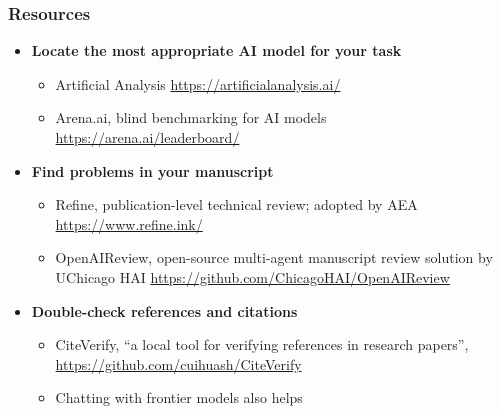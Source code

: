 \documentclass[aspectratio=169]{beamer}
\begin{document}
\begin{frame}
  \frametitle{Resources}
  \begin{itemize}
      \item \textbf{Locate the most appropriate AI model for your task}
        \begin{itemize}
          \item Artificial Analysis \url{https://artificialanalysis.ai/}
          \item Arena.ai, blind benchmarking for AI models \url{https://arena.ai/leaderboard/}
        \end{itemize}
      \item \textbf{Find problems in your manuscript}
        \begin{itemize}
          \item Refine, publication-level technical review; adopted by AEA \url{https://www.refine.ink/}
          \item OpenAIReview, open-source multi-agent manuscript review solution by UChicago HAI \url{https://github.com/ChicagoHAI/OpenAIReview}
          \end{itemize}
      \item \textbf{Double-check references and citations}
        \begin{itemize}
          \item CiteVerify, ``a local tool for verifying references in research papers'', \url{https://github.com/cuihuash/CiteVerify}
          \item Chatting with frontier models also helps 
          \end{itemize}
  \end{itemize}
\end{frame}
\end{document}
